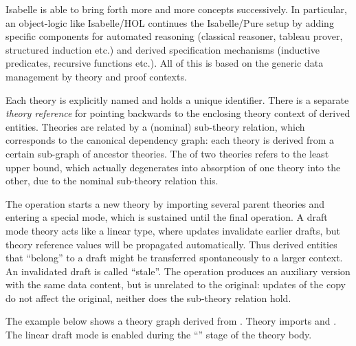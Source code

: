 \begin{isabellebody}
\begin{isamarkuptext}
  Isabelle is able to bring forth more and more concepts successively.
  In particular, an object-logic like Isabelle/HOL continues the
  Isabelle/Pure setup by adding specific components for automated
  reasoning (classical reasoner, tableau prover, structured induction
  etc.) and derived specification mechanisms (inductive predicates,
  recursive functions etc.).  All of this is based on the generic data
  management by theory and proof contexts.%
\end{isamarkuptext}%
\isamarkuptrue%
%
\isamarkuptrue%
%
\begin{isamarkuptext}%
Each theory is explicitly named and holds a unique identifier.
  There is a separate \emph{theory reference} for pointing backwards
  to the enclosing theory context of derived entities.  Theories are
  related by a (nominal) sub-theory relation, which corresponds to the
  canonical dependency graph: each theory is derived from a certain
  sub-graph of ancestor theories.  The  of two theories
  refers to the least upper bound, which actually degenerates into
  absorption of one theory into the other, due to the nominal
  sub-theory relation this.

  The  operation starts a new theory by importing
  several parent theories and entering a special  mode,
  which is sustained until the final  operation.  A draft
  mode theory acts like a linear type, where updates invalidate
  earlier drafts, but theory reference values will be propagated
  automatically.  Thus derived entities that ``belong'' to a draft
  might be transferred spontaneously to a larger context.  An
  invalidated draft is called ``stale''.  The  operation
  produces an auxiliary version with the same data content, but is
  unrelated to the original: updates of the copy do not affect the
  original, neither does the sub-theory relation hold.

  The example below shows a theory graph derived from .
  Theory  imports  and .
  The linear draft mode is enabled during the ``\isa{{\isasymdots}}'' stage of
  the theory body.


\end{isamarkuptext}
\end{isabellebody}
